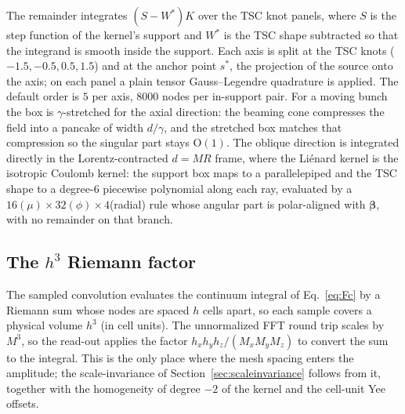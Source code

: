The remainder integrates $(S-W^\ast)K$ over the TSC knot panels, where $S$
is the step function of the kernel's support and $W^\ast$ is the TSC shape
subtracted so that the integrand is smooth inside the support. Each axis is
split at the TSC knots ($-1.5, -0.5, 0.5, 1.5$) and at the anchor point
$s^\ast$, the projection of the source onto the axis; on each panel a plain
tensor Gauss--Legendre quadrature is applied. The default order is $5$ per
axis, $8000$ nodes per in-support pair. For a moving bunch the box is
$\gamma$-stretched for the axial direction: the beaming cone compresses the
field into a pancake of width $d/\gamma$, and the stretched box matches
that compression so the singular part stays $\mathrm{O}(1)$. The oblique
direction is integrated directly in the Lorentz-contracted $d=MR$ frame, where
the Li\'enard kernel is the isotropic Coulomb kernel: the support box maps to a
parallelepiped and the TSC shape to a degree-6 piecewise polynomial along each
ray, evaluated by a $16(\mu)\times32(\phi)\times4$(radial) rule whose angular
part is polar-aligned with $\boldsymbol\beta$, with no remainder on that branch.

\subsection{The $h^3$ Riemann factor}

The sampled convolution evaluates the continuum integral of
Eq.~\eqref{eq:Fc} by a Riemann sum whose nodes are spaced $h$ cells apart,
so each sample covers a physical volume $h^3$ (in cell units). The
unnormalized FFT round trip scales by $M^3$, so the read-out applies the
factor $h_x h_y h_z/(M_x M_y M_z)$ to convert the sum to the integral.
This is the only place where the mesh spacing enters the amplitude; the
scale-invariance of Section~\ref{sec:scaleinvariance} follows from it,
together with the homogeneity of degree $-2$ of the kernel and the cell-unit
Yee offsets.
